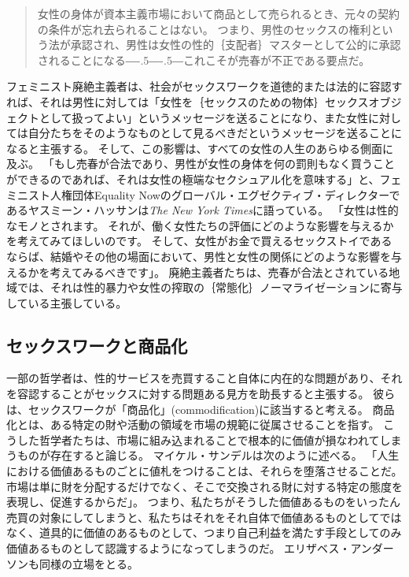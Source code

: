 \documentclass[paper=a4,book,openany]{jlreq}
\newcommand{\ig}[1]{}           %
\def\DDASH{―\kern-.5\zw―\kern-.5\zw―} %
\begin{document}
\begin{quote}
女性の身体が資本主義市場において商品として売られるとき、元々の契約の条件が忘れ去られることはない。
つまり、男性のセックスの権利という法が承認され、男性は女性の性的｛支配者｝{マスター}として公的に承認されることになる{\DDASH}これこそが売春が不正である要点だ。
\citep[p.208]{pateman88:_sexual_contr}
\end{quote}

フェミニスト廃絶主義者は、社会がセックスワークを道徳的または法的に容認すれば、それは男性に対しては「女性を｛セックスのための物体｝{セックスオブジェクト}として扱ってよい」というメッセージを送ることになり、また女性に対しては自分たちをそのようなものとして見るべきだというメッセージを送ることになると主張する。
そして、この影響は、すべての女性の人生のあらゆる側面に及ぶ。
「もし売春が合法であり、男性が女性の身体を何の罰則もなく買うことができるのであれば、それは女性の極端なセクシュアル化を意味する」と、フェミニスト人権団体Equality Nowのグローバル・エグゼクティブ・ディレクターであるヤスミーン・ハッサンは\emph{The New York Times}に語っている。
「女性は性的なモノとされます。
それが、働く女性たちの評価にどのような影響を与えるかを考えてみてほしいのです。
そして、女性がお金で買えるセックストイであるならば、結婚やその他の場面において、男性と女性の関係にどのような影響を与えるかを考えてみるべきです」\citep{bazelon16:_shoul_prost_be_crime}。
廃絶主義者たちは、売春が合法とされている地域では、それは性的暴力や女性の搾取の｛常態化｝{ノーマライゼーション}に寄与している主張している\citep[p.3]{waltman10:_prohib_purch_sex_sweden}。

\subsection{セックスワークと商品化}

一部の哲学者は、性的サービスを売買すること自体に内在的な問題があり、それを容認することがセックスに対する問題ある見方を助長すると主張する。
彼らは、セックスワークが「商品化」(commodification)に該当すると考える。
商品化とは、ある特定の財や活動の領域を市場の規範に従属させることを指す。
こうした哲学者たちは、市場に組み込まれることで根本的に価値が損なわれてしまうものが存在すると論じる。
マイケル・サンデルは次のように述べる。
「人生における価値あるものごとに値札をつけることは、それらを堕落させることだ。
市場は単に財を分配するだけでなく、そこで交換される財に対する特定の態度を表現し、促進するからだ」\citep[p.9]{sandel12:money_cant_buy}。
つまり、私たちがそうした価値あるものをいったん売買の対象にしてしまうと、私たちはそれをそれ自体で価値あるものとしてではなく、道具的に価値のあるものとして、つまり自己利益を満たす手段としてのみ価値あるものとして認識するようになってしまうのだ。
エリザベス・アンダーソン\ig{Elizabeth Anderson}も同様の立場をとる。
\end{document}
